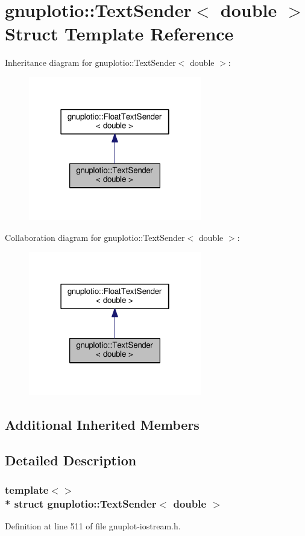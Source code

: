 \hypertarget{structgnuplotio_1_1_text_sender_3_01double_01_4}{}\section{gnuplotio\+:\+:Text\+Sender$<$ double $>$ Struct Template Reference}
\label{structgnuplotio_1_1_text_sender_3_01double_01_4}


Inheritance diagram for gnuplotio\+:\+:Text\+Sender$<$ double $>$\+:
\nopagebreak
\begin{figure}[H]
\begin{center}
\leavevmode
\includegraphics[width=214pt]{structgnuplotio_1_1_text_sender_3_01double_01_4__inherit__graph}
\end{center}
\end{figure}


Collaboration diagram for gnuplotio\+:\+:Text\+Sender$<$ double $>$\+:
\nopagebreak
\begin{figure}[H]
\begin{center}
\leavevmode
\includegraphics[width=214pt]{structgnuplotio_1_1_text_sender_3_01double_01_4__coll__graph}
\end{center}
\end{figure}
\subsection*{Additional Inherited Members}


\subsection{Detailed Description}
\subsubsection*{template$<$$>$\\*
struct gnuplotio\+::\+Text\+Sender$<$ double $>$}



Definition at line 511 of file gnuplot-\/iostream.\+h.

